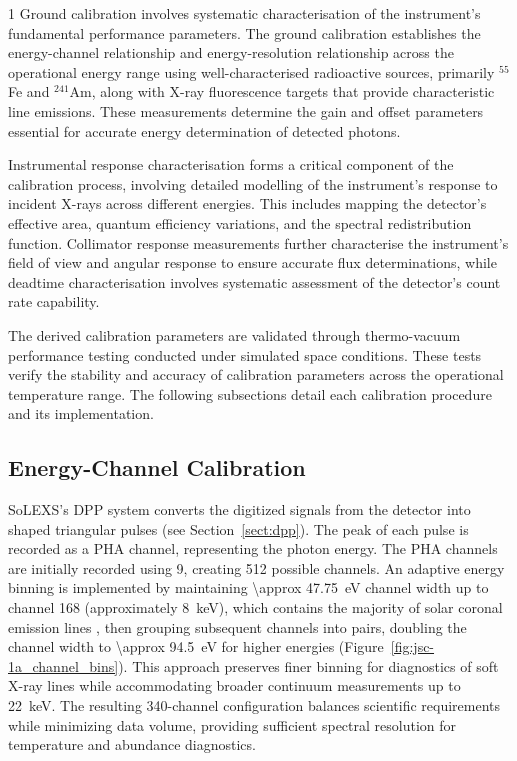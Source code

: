 \documentclass[12pt]{spieman}  %
\begin{document}
\begin{spacing}{1}
Ground calibration involves systematic characterisation of the instrument's fundamental performance parameters. The ground calibration establishes the energy-channel relationship and energy-resolution relationship across the operational energy range using well-characterised radioactive sources, primarily $^{55}$Fe and $^{241}$Am, along with X-ray fluorescence targets that provide characteristic line emissions. These measurements determine the gain and offset parameters essential for accurate energy determination of detected photons. 

Instrumental response characterisation forms a critical component of the calibration process, involving detailed modelling of the instrument's response to incident X-rays across different energies. This includes mapping the detector's effective area, quantum efficiency variations, and the spectral redistribution function. Collimator response measurements further characterise the instrument's field of view and angular response to ensure accurate flux determinations, while deadtime characterisation involves systematic assessment of the detector's count rate capability.

The derived calibration parameters are validated through thermo-vacuum performance testing conducted under simulated space conditions. These tests verify the stability and accuracy of calibration parameters across the operational temperature range. The following subsections detail each calibration procedure and its implementation.

\subsection{Energy-Channel Calibration}

SoLEXS's DPP system converts the digitized signals from the detector into shaped triangular pulses (see Section~\ref{sect:dpp}). The peak of each pulse is recorded as a PHA channel, representing the photon energy. The PHA channels are initially recorded using \SI{9}{\bit}, creating \num{512} possible channels. 
An adaptive energy binning is implemented by maintaining \SI{\approx 47.75}{\electronvolt} channel width up to channel \num{168} (approximately \SI{8}{\keV}), which contains the majority of solar coronal emission lines \cite{Phillips2004}, then grouping subsequent channels into pairs, doubling the channel width to \SI{\approx 94.5}{\electronvolt} for higher energies (Figure~\ref{fig:jsc-1a_channel_bins}). 
This approach preserves finer binning for diagnostics of soft X-ray lines while accommodating broader continuum measurements up to \SI{22}{keV}. 
The resulting \num{340}-channel configuration balances scientific requirements while minimizing data volume, providing sufficient spectral resolution for temperature and abundance diagnostics.


\end{spacing}
\end{document}
